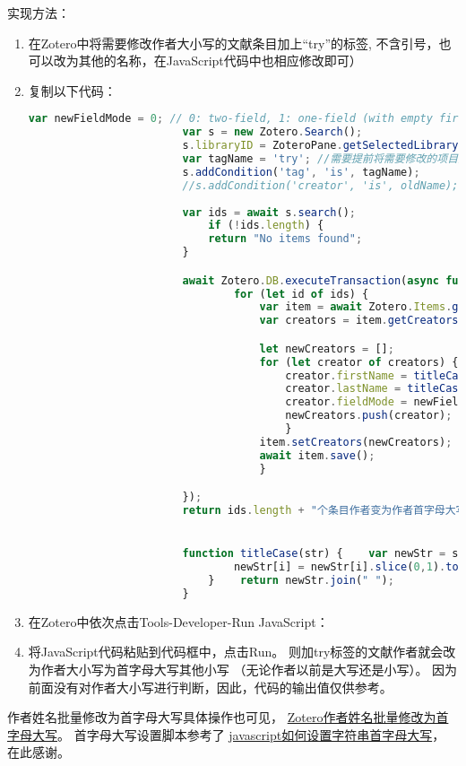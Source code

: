 \documentclass[cn,11pt,chinese]{elegantbook}
\begin{document}
			实现方法：
			\begin{enumerate}
				\item 在Zotero中将需要修改作者大小写的文献条目加上“try”的标签,
					不含引号，也可以改为其他的名称，在JavaScript代码中也相应修改即可）
				\item 复制以下代码：
					\begin{lstlisting}[language=JavaScript]
						var newFieldMode = 0; // 0: two-field, 1: one-field (with empty first name)
						var s = new Zotero.Search();
						s.libraryID = ZoteroPane.getSelectedLibraryID();
						var tagName = 'try'; //需要提前将需要修改的项目添加标签
						s.addCondition('tag', 'is', tagName);
						//s.addCondition('creator', 'is', oldName);
						
						var ids = await s.search();
							if (!ids.length) {
							return "No items found";
						}

						await Zotero.DB.executeTransaction(async function () {
								for (let id of ids) {
									var item = await Zotero.Items.getAsync(id);
									var creators = item.getCreators();

									let newCreators = [];
									for (let creator of creators) {
										creator.firstName = titleCase(creator.firstName.trim());
										creator.lastName = titleCase(creator.lastName.trim());
										creator.fieldMode = newFieldMode;
										newCreators.push(creator);
										} 
									item.setCreators(newCreators);
									await item.save();
									}  

						}); 
						return ids.length + "个条目作者变为作者首字母大写。";


						function titleCase(str) {    var newStr = str.split(" ");    for(var i = 0; i<newStr.length; i++){
								newStr[i] = newStr[i].slice(0,1).toUpperCase() + newStr[i].slice(1).toLowerCase();
							}    return newStr.join(" ");
						}
						\end{lstlisting}
			
		 \item 在Zotero中依次点击Tools-Developer-Run JavaScript：
		 \item 将JavaScript代码粘贴到代码框中，点击Run。
		 	则加try标签的文献作者就会改为作者大小写为首字母大写其他小写
			 （无论作者以前是大写还是小写）。
			 因为前面没有对作者大小写进行判断，因此，代码的输出值仅供参考。
		\end{enumerate}
			 
		
		作者姓名批量修改为首字母大写具体操作也可见，
			 \href{https://zhuanlan.zhihu.com/p/354481222}
			 {Zotero作者姓名批量修改为首字母大写}。
			 首字母大写设置脚本参考了
			 \href{https://blog.csdn.net/dongjt_china/article/details/107283450#:~:text=%E5%9C%A8javascr,%EF%BC%8C%E5%85%B6%E4%BD%99%E9%83%A8%E5%88%86%E5%B0%8F%E5%86%99%E3%80%82}
			 {javascript如何设置字符串首字母大写}，
在此感谢。
		
\end{document}
